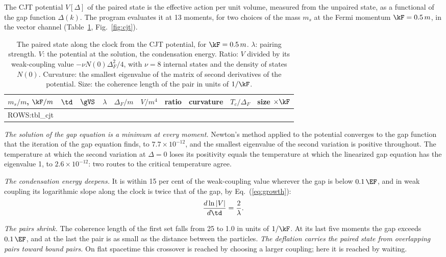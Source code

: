 The CJT potential $V[\Delta]$ of the paired state is the effective action per unit volume, measured
from the unpaired state, as a functional of the gap function $\Delta(k)$. The program evaluates it at
13 moments, for two choices of the mass $m_s$ at the Fermi momentum $\kF=0.5\,m$, in the vector
channel (Table~\ref{tab:cjt}, Fig.~\ref{fig:cjt}).

\begin{table}
\caption{\label{tab:cjt}The paired state along the clock from the CJT potential, for $\kF=0.5\,m$.
$\lambda$: pairing strength. $V$: the potential at the solution, the condensation energy. Ratio: $V$
divided by its weak-coupling value $-\nu N(0)\Delta_F^{2}/4$, with $\nu=8$ internal states and the
density of states $N(0)$. Curvature: the smallest eigenvalue of the matrix of second derivatives of
the potential. Size: the coherence length of the pair in units of $1/\kF$.}
\begin{ruledtabular}
\begin{tabular}{cccccccccc}
$m_s/m$, $\kF/m$ & $\td$ & $\gVS$ & $\lambda$ & $\Delta_F/m$ & $V/m^{4}$ & ratio & curvature & $T_c/\Delta_F$ & size $\times\kF$ \\
\hline
{{ROWS:tbl_cjt}}
\end{tabular}
\end{ruledtabular}
\end{table}

\emph{The solution of the gap equation is a minimum at every moment.} Newton's method applied to the
potential converges to the gap function that the iteration of the gap equation finds, to
$7.7\times10^{-12}$, and the smallest eigenvalue of the second variation is positive throughout. The
temperature at which the second variation at $\Delta=0$ loses its positivity equals the temperature
at which the linearized gap equation has the eigenvalue 1, to $2.6\times10^{-12}$: two routes to the
critical temperature agree.

\emph{The condensation energy deepens.} It is within 15 per cent of the weak-coupling value wherever
the gap is below $0.1\,\EF$, and in weak coupling its logarithmic slope along the clock is twice that
of the gap, by Eq.~(\ref{eq:growth}):
\begin{equation}
\frac{d\ln|V|}{d\td}=\frac{2}{\lambda}.
\end{equation}

\emph{The pairs shrink.} The coherence length of the first set falls from 25 to 1.0 in units of
$1/\kF$. At its last five moments the gap exceeds $0.1\,\EF$, and at the last the pair is as small
as the distance between the particles. \emph{The deflation carries the paired state from overlapping
pairs toward bound pairs.} On flat spacetime this crossover \cite{NozieresSchmittRink1985,Leggett1975}
is reached by choosing a larger coupling; here it is reached by waiting.

